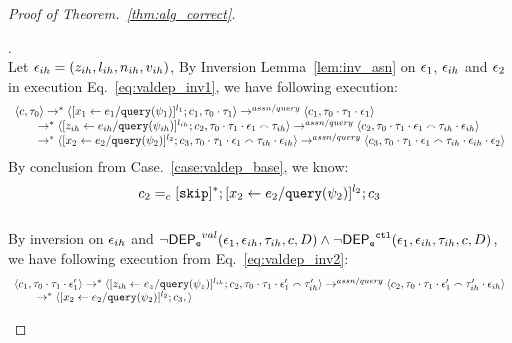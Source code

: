 \begin{proof}[Proof of Theorem.~\ref{thm:alg_correct}]
\begin{case}
\begin{subcase}
\label{case:valdep_ihindep}.
\\
Let $\mathtt{\epsilon}_{ih} = (z_{ih}, l_{ih}, n_{ih}, v_{ih})$, 
%
By Inversion Lemma~\ref{lem:inv_asn} on $\mathtt{\epsilon}_1$, $\mathtt{\epsilon}_{ih}$ and $\mathtt{\epsilon}_2$ in execution Eq.~\ref{eq:valdep_inv1}, we have following execution:
\begin{equation}
\label{eq:m1asn_inv1}
  \begin{array}{l}   
\langle {c}, \mathtt{\tau}_0 \rangle \rightarrow^{*} 
\langle [\mathrel{ {x}_1 \leftarrow e_1 / {\tt query}(\psi_1) }]^{l_1} ; {c}_1, \mathtt{\tau}_0 \cdot \mathtt{\tau}_1 \rangle  \rightarrow^{assn/query}
 \langle c_1, \mathtt{\tau}_0 \cdot \mathtt{\tau}_1 \cdot \mathtt{\epsilon}_1 \rangle \\
  \qquad \rightarrow^{*} 
  \langle [\mathrel{ z_{ih} \leftarrow e_{ih} / {\tt query}(\psi_{ih}) }]^{l_{ih}};{c}_2, 
  \mathtt{\tau}_0 \cdot \mathtt{\tau}_1 \cdot \mathtt{\epsilon}_1 \smallfrown \mathtt{\tau}_{ih} \rangle 
  \rightarrow^{assn/query} 
  \langle {c}_2,  \mathtt{\tau}_0 \cdot \mathtt{\tau}_1 \cdot \mathtt{\epsilon}_1 \smallfrown \mathtt{\tau}_{ih} \cdot \mathtt{\epsilon}_{ih} \rangle  \\
  \qquad \rightarrow^{*} 
  \langle [\mathrel{ {x}_2 \leftarrow e_2 / {\tt query}(\psi_2) }]^{l_2};{c}_3, 
  \mathtt{\tau}_0 \cdot \mathtt{\tau}_1 \cdot \mathtt{\epsilon}_1  \smallfrown \mathtt{\tau}_{ih} \cdot \mathtt{\epsilon}_{ih} \rangle 
  \rightarrow^{assn/query} 
  \langle {c}_3,  \mathtt{\tau}_0 \cdot \mathtt{\tau}_1 \cdot \mathtt{\epsilon}_1  \smallfrown \mathtt{\tau}_{ih} \cdot \mathtt{\epsilon}_{ih} \cdot \mathtt{\epsilon}_2 \rangle 
\end{array}
 \end{equation}
By conclusion from Case.~\ref{case:valdep_base}, we know:
\[
 c_2 =_c [\mathtt{skip}]{}^*; [\mathrel{ {x}_2 \leftarrow e_2 / {\tt query}(\psi_2) }]^{l_2};{c}_3
 \]
%
\\
By inversion on $\mathtt{\epsilon}_{ih}$ and $\neg \mathsf{DEP_{\mathtt{e}}}^{val}(\mathtt{\epsilon}_1, \mathtt{\epsilon}_{ih}, \mathtt{\tau}_{ih}, c, D) \land  \neg\mathsf{DEP_{\mathtt{e}}}^{\mathtt{{ctl}}}(\mathtt{\epsilon}_1, \mathtt{\epsilon}_{ih}, \mathtt{\tau}_{ih}, c, D) $,
we have following execution from Eq.~\ref{eq:valdep_inv2}:
\begin{equation}
\label{eq:m1asn_inv2}
  \begin{array}{l}   
  \langle c_1, \mathtt{\tau}_0 \cdot \mathtt{\tau}_1 \cdot \mathtt{\epsilon}_1' \rangle 
  \rightarrow^{*} 
  \langle [\mathrel{ z_{ih} \leftarrow e_z / {\tt query}(\psi_z) }]^{l_{ih}};{c}_2, 
  \mathtt{\tau}_0 \cdot \mathtt{\tau}_1 \cdot \mathtt{\epsilon}_1' \smallfrown \mathtt{\tau}_{ih}' \rangle 
  \rightarrow^{assn/query} 
  \langle {c}_2,  \mathtt{\tau}_0 \cdot \mathtt{\tau}_1 \cdot \mathtt{\epsilon}_1'  \smallfrown \mathtt{\tau}_{ih}' \cdot \mathtt{\epsilon}_{ih} \rangle  \\
  \qquad \rightarrow^{*} 
  \langle [\mathrel{ {x}_2 \leftarrow e_2 / {\tt query}(\psi_2) }]^{l_2};{c}_3, 
 \rangle
\end{array}
\end{equation}
\end{subcase}
\end{case}
\end{proof}
